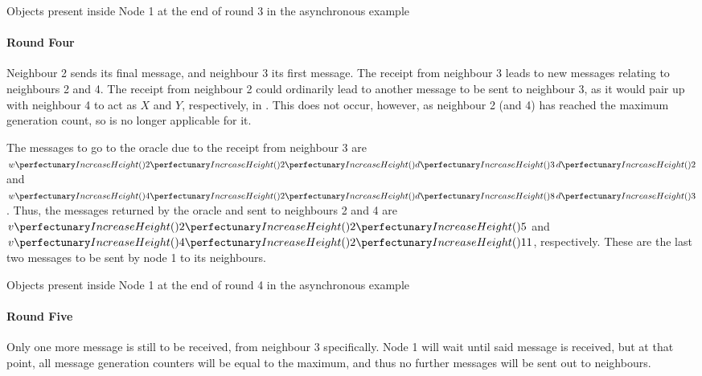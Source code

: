 \begin{cpobjectsfloat}
\begin{cpobjects}
\end{cpobjects}
\caption{\label{objs:nmp:ex3}Objects present inside Node 1 at the end of round 3 in the asynchronous  example}
\end{cpobjectsfloat}

\paragraph{Round Four}
Neighbour 2 sends its final message, and neighbour 3 its first message.  The receipt from neighbour 3 leads to new messages relating to neighbours 2 and 4.  The receipt from neighbour 2 could ordinarily lead to another message to be sent to neighbour 3, as it would pair up with neighbour 4 to act as \(X\) and \(Y\), respectively, in .  This does not occur, however, as neighbour 2 (and 4) has reached the maximum generation count, so  is no longer applicable for it.

The messages to go to the oracle due to the receipt from neighbour 3 are \(\cpvw{2}{2}{\cpfunc{d}{3} \, \cpfunc{d}{2}}\) and \(\cpvw{4}{2}{\cpfunc{d}{8} \, \cpfunc{d}{3}}\).  Thus, the messages returned by the oracle and sent to neighbours 2 and 4 are \(\cpvv{2}{2}{5}\) and \(\cpvv{4}{2}{11}\), respectively.  These are the last two messages to be sent by node 1 to its neighbours.

\begin{cpobjectsfloat}
\begin{cpobjects}
\end{cpobjects}
\caption{\label{objs:nmp:ex4}Objects present inside Node 1 at the end of round 4 in the asynchronous  example}
\end{cpobjectsfloat}

\paragraph{Round Five}
Only one more message is still to be received, from neighbour 3 specifically. Node 1 will wait until said message is received, but at that point, all message generation counters will be equal to the maximum, and thus no further messages will be sent out to neighbours.

